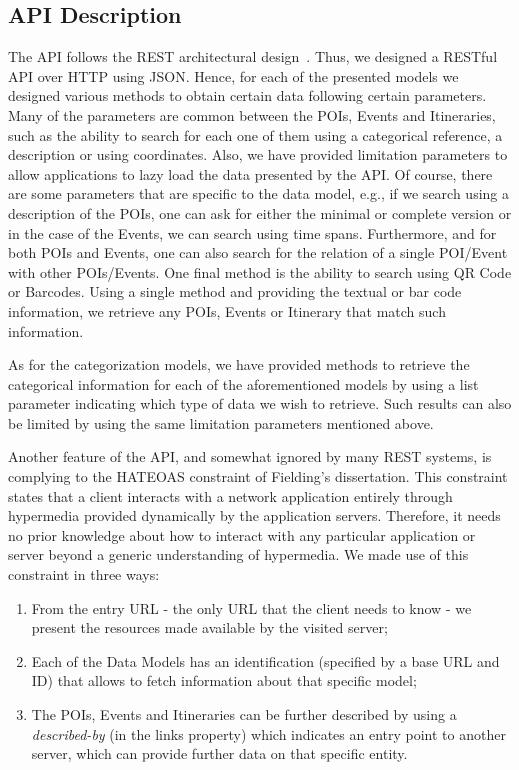 \documentclass[times]{ettauth}
\begin{document}
\subsection{API Description}
\label{s:api-description}
The API follows the \ac{REST} architectural design~\cite{Fielding:2002:PDM:514183.514185}. Thus, we designed a RESTful API over HTTP using JSON. Hence, for each of the presented models we designed various methods to obtain certain data following certain parameters. Many of the parameters are common between the \acp{POI}, Events and Itineraries, such as the ability to search for each one of them using a categorical reference, a description or using coordinates. Also, we have provided limitation parameters to allow applications to lazy load the data presented by the API. Of course, there are some parameters that are specific to the data model, e.g., if we search using a description of the \acp{POI}, one can ask for either the minimal or complete version or in the case of the Events, we can search using time spans. Furthermore, and for both \acp{POI} and Events, one can also search for the relation of a single \ac{POI}/Event with other \acp{POI}/Events. One final method is the ability to search using QR Code or Barcodes. Using a single method and providing the textual or bar code information, we retrieve any POIs, Events or Itinerary that match such information.

As for the categorization models, we have provided methods to retrieve the categorical information for each of the aforementioned models by using a list parameter indicating which type of data we wish to retrieve. Such results can also be limited by using the same limitation parameters mentioned above.

Another feature of the API, and somewhat ignored by many REST systems, is complying to the \acf{HATEOAS} constraint of Fielding's dissertation. This constraint states that a client interacts with a network application entirely through hypermedia provided dynamically by the application servers. Therefore, it needs no prior knowledge about how to interact with any particular application or server beyond a generic understanding of hypermedia. We made use of this constraint in three ways:
\begin{enumerate}
\item From the entry URL - the only URL that the client needs to know - we present the resources made available by the visited server;
\item Each of the Data Models has an identification (specified by a base URL and ID) that allows to fetch information about that specific model;
\item The POIs, Events and Itineraries can be further described by using a \textit{described-by} (in the links property) which indicates an entry point to another server, which can provide further data on that specific entity.
\end{enumerate}
\end{document}
